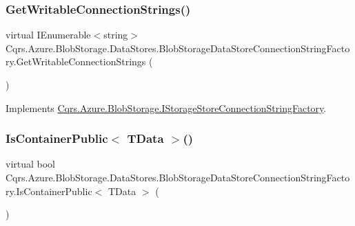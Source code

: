 \subsubsection{\texorpdfstring{Get\+Writable\+Connection\+Strings()}{GetWritableConnectionStrings()}}
{\footnotesize\ttfamily virtual I\+Enumerable$<$string$>$ Cqrs.\+Azure.\+Blob\+Storage.\+Data\+Stores.\+Blob\+Storage\+Data\+Store\+Connection\+String\+Factory.\+Get\+Writable\+Connection\+Strings (\begin{DoxyParamCaption}{ }\end{DoxyParamCaption})\hspace{0.3cm}{\ttfamily [virtual]}}



Implements \hyperlink{interfaceCqrs_1_1Azure_1_1BlobStorage_1_1IStorageStoreConnectionStringFactory_a26ecfd0805fe3d525e9fa419330bd140_a26ecfd0805fe3d525e9fa419330bd140}{Cqrs.\+Azure.\+Blob\+Storage.\+I\+Storage\+Store\+Connection\+String\+Factory}.

\mbox{\label{classCqrs_1_1Azure_1_1BlobStorage_1_1DataStores_1_1BlobStorageDataStoreConnectionStringFactory_a96e368a2b00f9614eff6ca4bcdeb3a24_a96e368a2b00f9614eff6ca4bcdeb3a24}} 
\subsubsection{\texorpdfstring{Is\+Container\+Public$<$ T\+Data $>$()}{IsContainerPublic< TData >()}}
{\footnotesize\ttfamily virtual bool Cqrs.\+Azure.\+Blob\+Storage.\+Data\+Stores.\+Blob\+Storage\+Data\+Store\+Connection\+String\+Factory.\+Is\+Container\+Public$<$ T\+Data $>$ (\begin{DoxyParamCaption}{ }\end{DoxyParamCaption})\hspace{0.3cm}{\ttfamily [virtual]}}



